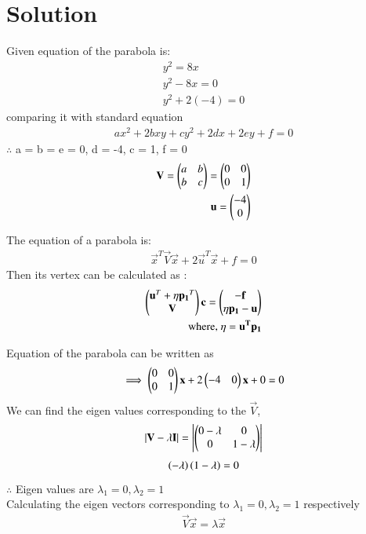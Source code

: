 \documentclass[journal,12pt,twocolumn]{IEEEtran}
\begin{document}
\section{Solution}
Given equation of the parabola is:
\begin{align}
    y^2=8x\\
    y^2-8x=0\\
    y^2+2(-4)=0
\end{align}
comparing it with standard equation
\begin{align}
    ax^2+2bxy+cy^2+2dx+2ey+f=0
\end{align}
$\therefore$  a = b = e = 0, d = -4, c = 1, f = 0
\begin{align}
   \mathbf{V}=\begin{pmatrix}a&b\\b&c\end{pmatrix}=\begin{pmatrix}0&0\\0&1\end{pmatrix}\\
   \mathbf{u}=\begin{pmatrix}-4\\0\end{pmatrix} 
\end{align}
\begin{lemma}
The equation of a parabola is:
\begin{align}
    \vec{x}^T\vec{V}\vec{x}+2\vec{u}^T\vec{x}+f=0
\end{align}
Then its vertex can be calculated as :
\begin{align}
    \begin{pmatrix}\mathbf{u}^T+\eta\mathbf{p_1}^T\\\mathbf{V}\end{pmatrix}\mathbf{c}=\begin{pmatrix}\mathbf{-f}\\\eta\mathbf{p_1}-\mathbf{u}\end{pmatrix}\\
    \text{where, } \eta=\mathbf{u^T}\mathbf{p_1}
\end{align}
\end{lemma}
Equation of the parabola can be written as
\begin{align}
   \implies \begin{pmatrix}0&0\\0&1\end{pmatrix}\mathbf{x}+2\begin{pmatrix}-4&0\end{pmatrix}\mathbf{x}+0=0
\end{align}
We can find the eigen values corresponding to the $\vec{V}$,
\begin{align}
\left|\mathbf{V}-\lambda\mathbf{I}\right| =\left|\begin{pmatrix}0-\lambda&0\\0&1-\lambda\end{pmatrix}\right|
\end{align}
\begin{align}
    \left(-\lambda\right)\left(1-\lambda\right)=0
\end{align}
$\therefore$
Eigen values are $ \lambda_1=0,\lambda_2=1$
\\
Calculating the eigen vectors corresponding to  $ \lambda_1=0,\lambda_2=1$ respectively
\begin{align}
    \vec{V}\vec{x}=\lambda\vec{x}
\end{align}
\end{document}
